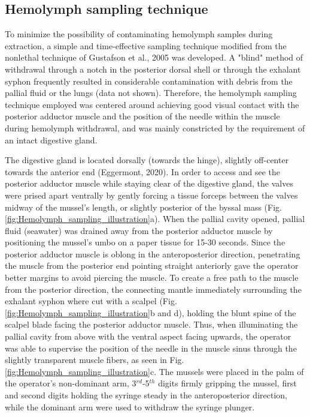 \subsection{Hemolymph sampling technique}
To minimize the possibility of contaminating hemolymph samples during extraction, a simple and time-effective sampling technique modified from the nonlethal technique of Gustafson et al., 2005 was developed. A "blind" method of withdrawal through a notch in the posterior dorsal shell or through the exhalant syphon frequently resulted in considerable contamination with debris from the pallial fluid or the lungs (data not shown). Therefore, the hemolymph sampling technique employed was centered around achieving good visual contact with the posterior adductor muscle and the position of the needle within the muscle during hemolymph withdrawal, and was mainly constricted by the requirement of an intact digestive gland.

The digestive gland is located dorsally (towards the hinge), slightly off-center towards the anterior end (Eggermont, 2020). In order to access and see the posterior adductor muscle while staying clear of the digestive gland, the valves were prised apart ventrally by gently forcing a tissue forceps between the valves midway of the mussel's length, or slightly posterior of the byssal mass (Fig. \ref{fig:Hemolymph_sampling_illustration}a). When the pallial cavity opened, pallial fluid (seawater) was drained away from the posterior adductor muscle by positioning the mussel's umbo on a paper tissue for 15-30 seconds. Since the posterior adductor muscle is oblong in the anteroposterior direction, penetrating the muscle from the posterior end pointing straight anteriorly gave the operator better margins to avoid piercing the muscle. To create a free path to the muscle from the posterior direction, the connecting mantle immediately surrounding the exhalant syphon where cut with a scalpel (Fig. \ref{fig:Hemolymph_sampling_illustration}b and d), holding the blunt spine of the scalpel blade facing the posterior adductor muscle.  Thus, when illuminating the pallial cavity from above with the ventral aspect facing upwards, the operator was able to supervise the position of the needle in the muscle sinus through the slightly transparent muscle fibers, as seen in Fig. \ref{fig:Hemolymph_sampling_illustration}c. The mussels were placed in the palm of the operator's non-dominant arm, 3$^{rd}$-5$^{th}$ digits firmly gripping the mussel, first and second digits holding the syringe steady in the anteroposterior direction, while the dominant arm were used to withdraw the syringe plunger.

